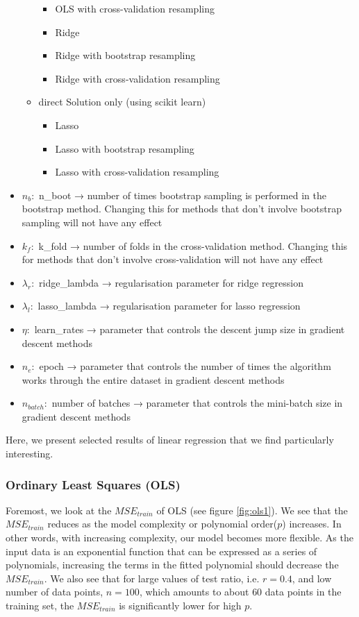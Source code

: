 \begin{itemize}
\begin{itemize}
\begin{itemize}
            \item OLS with cross-validation resampling
            \item Ridge
            \item Ridge with bootstrap resampling
            \item Ridge with cross-validation resampling
        \end{itemize}
        \item direct Solution only (using scikit learn)
        \begin{itemize}
            \item Lasso
            \item Lasso with bootstrap resampling
            \item Lasso with cross-validation resampling
        \end{itemize}
    \end{itemize}
    \item $n_b:$  n\_boot → number of times bootstrap sampling is performed in the bootstrap method. Changing this for methods that don't involve bootstrap sampling will not have any effect
    \item $k_f:$  k\_fold → number of folds in the cross-validation method. Changing this for methods that don't involve cross-validation will not have any effect
    \item $\lambda_r:$  ridge\_lambda → regularisation parameter for ridge regression
    \item $\lambda_l:$ lasso\_lambda → regularisation parameter for lasso regression
    \item $\eta:$ learn\_rates → parameter that controls the descent jump size in gradient descent methods
    \item $n_e:$ epoch → parameter that controls the number of times the algorithm works through the entire dataset in gradient descent methods
    \item $n_{batch}:$ number of batches → parameter that controls the mini-batch size in gradient descent methods
\end{itemize}

Here, we present selected results of linear regression that we find particularly interesting. 

\subsubsection{Ordinary Least Squares (OLS)}

Foremost, we look at the $MSE_{train}$ of OLS (see figure \ref{fig:ols1}). We see that the $MSE_{train}$ reduces as the model complexity or polynomial order($p$) increases. In other words, with increasing complexity, our model becomes more flexible. As the input data is an exponential function that can be expressed as a series of polynomials, increasing the terms in the fitted polynomial should decrease the $MSE_{train}$. We also see that for large values of test ratio, i.e. $r = 0.4$, and low number of data points, $n = 100$, which amounts to about $60$ data points in the training set, the $MSE_{train}$ is significantly lower for high $p$.

